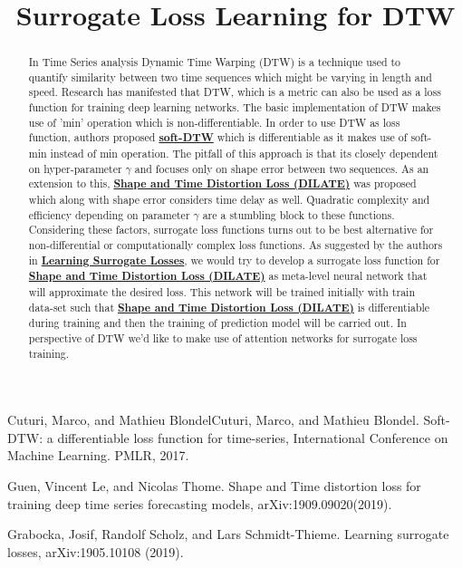 \documentclass{article}
\title{\textbf{Surrogate Loss Learning for DTW}}
\date{\vspace{-5ex}}
\begin{document}
\maketitle

\begin{abstract}
\Large
In Time Series analysis Dynamic Time Warping (DTW) is a technique used to quantify similarity between two time sequences which might be varying in length and speed. Research has manifested that DTW, which is a metric can also be used as a loss function for training deep learning networks. 
The basic implementation of DTW makes use of 'min' operation which is non-differentiable. 
In order to use DTW as loss function, authors proposed \hyperlink{1}{\textbf{soft-DTW}} which is differentiable as it makes use of soft-min instead of min operation. The pitfall of this approach is that its closely dependent on hyper-parameter $\gamma$ and focuses only on shape error between two sequences.
As an extension to this, \hyperlink{2}{\textbf{Shape and Time Distortion Loss (DILATE)}} was proposed which along with shape error considers time delay as well. Quadratic complexity and efficiency depending on parameter $\gamma$ are a stumbling block to these functions. \\
Considering these factors, surrogate loss functions turns out to be best alternative for non-differential or computationally complex loss functions. 
As suggested by the authors in \hyperlink{3}{\textbf{Learning Surrogate Losses}}, we would try to develop a surrogate loss function for \hyperlink{2}{\textbf{Shape and Time Distortion Loss (DILATE)}} as meta-level neural network that will approximate the desired loss. This network will be trained initially with train data-set such that \hyperlink{2}{\textbf{Shape and Time Distortion Loss (DILATE)}} is differentiable during training and then the training of prediction model will be carried out. 
In perspective of DTW we'd like to make use of attention networks for surrogate loss training. 
\end{abstract}


\begin{thebibliography}{3}
\hypertarget{1}{
Cuturi, Marco, and Mathieu BlondelCuturi, Marco, and Mathieu Blondel. Soft-DTW: a differentiable loss function for time-series, International Conference on Machine Learning. PMLR, 2017.}

\hypertarget{2}{
Guen, Vincent Le, and Nicolas Thome. Shape and Time distortion loss
for training deep time series forecasting models, arXiv:1909.09020(2019).}

\hypertarget{3}{
 Grabocka, Josif, Randolf Scholz, and Lars Schmidt-Thieme. Learning
surrogate losses, arXiv:1905.10108 (2019).}

\end{thebibliography}
\end{document}
